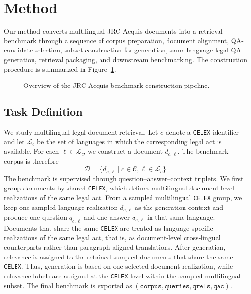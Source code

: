 \section{Method}

Our method converts multilingual JRC-Acquis documents into a retrieval benchmark through a sequence of corpus preparation, document alignment, QA-candidate selection, subset construction for generation, same-language legal QA generation, retrieval packaging, and downstream benchmarking. The construction procedure is summarized in Figure~\ref{fig:jrc-method-overview}.

\begin{figure}[t]
\centering
{}
\caption{Overview of the JRC-Acquis benchmark construction pipeline.}
\label{fig:jrc-method-overview}
\end{figure}

\subsection{Task Definition}

We study multilingual legal document retrieval. Let \(c\) denote a \texttt{CELEX} identifier and let \(\mathcal{L}_c\) be the set of languages in which the corresponding legal act is available. For each \(\ell \in \mathcal{L}_c\), we construct a document \(d_{c,\ell}\). The benchmark corpus is therefore
\[
\mathcal{D} = \{ d_{c,\ell} \mid c \in \mathcal{C}, \ell \in \mathcal{L}_c \}.
\]
The benchmark is supervised through question--answer--context triplets. We first group documents by shared \texttt{CELEX}, which defines multilingual document-level realizations of the same legal act. From a sampled multilingual \texttt{CELEX} group, we keep one sampled language realization \(d_{c,\ell}\) as the generation context and produce one question \(q_{c,\ell}\) and one answer \(a_{c,\ell}\) in that same language. Documents that share the same \texttt{CELEX} are treated as language-specific realizations of the same legal act, that is, as document-level cross-lingual counterparts rather than paragraph-aligned translations. After generation, relevance is assigned to the retained sampled documents that share the same \texttt{CELEX}. Thus, generation is based on one selected document realization, while relevance labels are assigned at the \texttt{CELEX} level within the sampled multilingual subset. The final benchmark is exported as \((\texttt{corpus}, \texttt{queries}, \texttt{qrels}, \texttt{qac})\).

